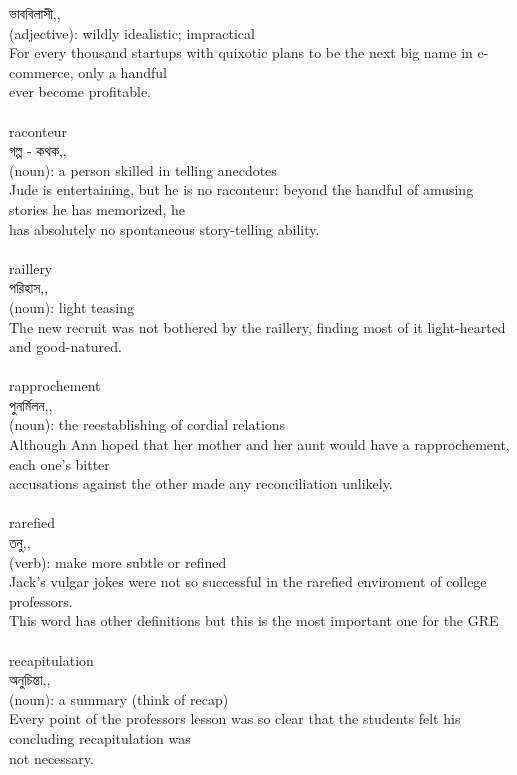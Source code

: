 \documentclass{article}
\begin{document}
{{ভাববিলাসী,,}\\
{(adjective): wildly idealistic; impractical\\For every thousand startups with quixotic plans to be the next big name in e-commerce, only a handful\\ever become profitable.\\}\\
{raconteur}\\
{গল্প - কথক,,}\\
{(noun): a person skilled in telling anecdotes\\Jude is entertaining, but he is no raconteur: beyond the handful of amusing stories he has memorized, he\\has absolutely no spontaneous story-telling ability.\\}\\
{raillery}\\
{পরিহাস,,}\\
{(noun): light teasing\\The new recruit was not bothered by the raillery, finding most of it light-hearted and good-natured.\\}\\
{rapprochement}\\
{পুনর্মিলন,,}\\
{(noun): the reestablishing of cordial relations\\Although Ann hoped that her mother and her aunt would have a rapprochement, each one's bitter\\accusations against the other made any reconciliation unlikely.\\}\\
{rarefied}\\
{তনু,,}\\
{(verb): make more subtle or refined\\Jack's vulgar jokes were not so successful in the rarefied enviroment of college professors.\\This word has other definitions but this is the most important one for the GRE\\}\\
{recapitulation}\\
{অনুচিন্তা,,}\\
{(noun): a summary (think of recap)\\Every point of the professors lesson was so clear that the students felt his concluding recapitulation was\\not necessary.\\}\\
}
\end{document}

